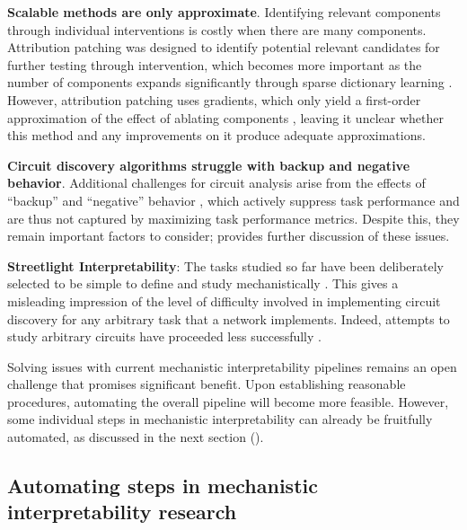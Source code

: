 \textbf{Scalable methods are only approximate}. Identifying relevant components through individual interventions is costly when there are many components. Attribution patching \citet{syed2023attributionpatchingoutperformsautomated} was designed to identify potential relevant candidates for further testing through intervention, which becomes more important as the number of components expands significantly through sparse dictionary learning \citep{marks2024sparsefeaturecircuitsdiscovering}. However, attribution patching uses gradients, which only yield a first-order approximation of the effect of ablating components \citep{wu2024replymakelovetal, molchanov2017pruning}, leaving it unclear whether this method and any improvements on it \citep{kramár2024atpefficientscalablemethod} produce adequate approximations.

\textbf{Circuit discovery algorithms struggle with backup and negative behavior}. Additional challenges for circuit analysis arise from the effects of “backup” and “negative” behavior \citep{Wang_2022_Circuits,mcgrath2023hydraeffectemergentselfrepair, mcdougall2023copysuppressioncomprehensivelyunderstanding}, which actively suppress task performance and are thus not captured by maximizing task performance metrics. Despite this, they remain important factors to consider; \citet{mueller2024missedcausesambiguouseffects} provides further discussion of these issues.

\textbf{Streetlight Interpretability}: The tasks studied so far have been deliberately selected to be simple to define and study mechanistically \citep{Wang_2022_Circuits}. This gives a misleading impression of the level of difficulty involved in implementing circuit discovery for any arbitrary task that a network implements. Indeed, attempts to study arbitrary circuits have proceeded less successfully \citep{nanda2023fact}.

Solving issues with current mechanistic interpretability pipelines remains an open challenge that promises significant benefit. Upon establishing reasonable procedures, automating the overall pipeline will become more feasible. However, some individual steps in mechanistic interpretability can already be fruitfully automated, as discussed in the next section ().

\subsection{Automating steps in mechanistic interpretability research}
\label{subsec:automation}

